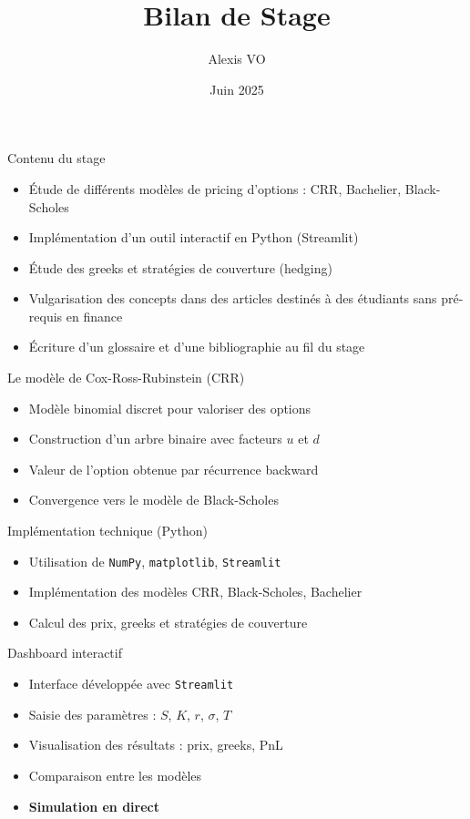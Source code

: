 \documentclass{beamer}
\title{Bilan de Stage}
\author{Alexis VO}
\date{Juin 2025}
\begin{document}
\frame{\titlepage}

\begin{frame}{Contenu du stage}
\begin{itemize}
    \item Étude de différents modèles de pricing d'options : CRR, Bachelier, Black-Scholes
    \item Implémentation d'un outil interactif en Python (Streamlit)
    \item Étude des greeks et stratégies de couverture (hedging)
    \item Vulgarisation des concepts dans des articles destinés à des étudiants sans pré-requis en finance
    \item Écriture d'un glossaire et d'une bibliographie au fil du stage
\end{itemize}
\end{frame}

\begin{frame}{Le modèle de Cox-Ross-Rubinstein (CRR)}
\begin{itemize}
    \item Modèle binomial discret pour valoriser des options
    \item Construction d'un arbre binaire avec facteurs $u$ et $d$
    \item Valeur de l’option obtenue par récurrence backward
    \item Convergence vers le modèle de Black-Scholes
\end{itemize}
\end{frame}

\begin{frame}{Implémentation technique (Python)}
\begin{itemize}
    \item Utilisation de \texttt{NumPy}, \texttt{matplotlib}, \texttt{Streamlit}
    \item Implémentation des modèles CRR, Black-Scholes, Bachelier
    \item Calcul des prix, greeks et stratégies de couverture
\end{itemize}
\end{frame}

\begin{frame}{Dashboard interactif}
\begin{itemize}
    \item Interface développée avec \texttt{Streamlit}
    \item Saisie des paramètres : $S$, $K$, $r$, $\sigma$, $T$
    \item Visualisation des résultats : prix, greeks, PnL
    \item Comparaison entre les modèles
    \item \textbf{Simulation en direct}
\end{itemize}
\end{frame}
\end{document}
